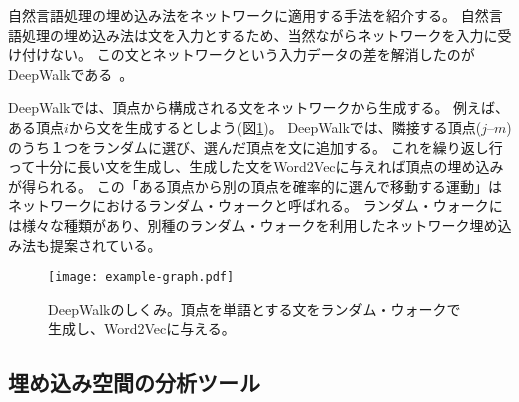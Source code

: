\documentclass[J]{scitrans}
\begin{document}
自然言語処理の埋め込み法をネットワークに適用する手法を紹介する。
自然言語処理の埋め込み法は文を入力とするため、当然ながらネットワークを入力に受け付けない。
この文とネットワークという入力データの差を解消したのがDeepWalkである~\cite{Bryan2014}。
%
%
%
%

DeepWalkでは、頂点から構成される文をネットワークから生成する。
例えば、ある頂点$i$から文を生成するとしよう(図\ref{fig:deepwalk})。
DeepWalkでは、隣接する頂点($j$--$m$)のうち１つをランダムに選び、選んだ頂点を文に追加する。
これを繰り返し行って十分に長い文を生成し、生成した文をWord2Vecに与えれば頂点の埋め込みが得られる。
この「ある頂点から別の頂点を確率的に選んで移動する運動」はネットワークにおけるランダム・ウォークと呼ばれる。
ランダム・ウォークには様々な種類があり、別種のランダム・ウォークを利用したネットワーク埋め込み法も提案されている\cite{Grover2016,Dong2017}。
\begin{figure}[h!]
    \centering
    \texttt{[image: example-graph.pdf]}
    \caption{
        DeepWalkのしくみ。頂点を単語とする文をランダム・ウォークで生成し、Word2Vecに与える。
    }
    \label{fig:deepwalk}
\end{figure}


\subsection{埋め込み空間の分析ツール}
\end{document}
